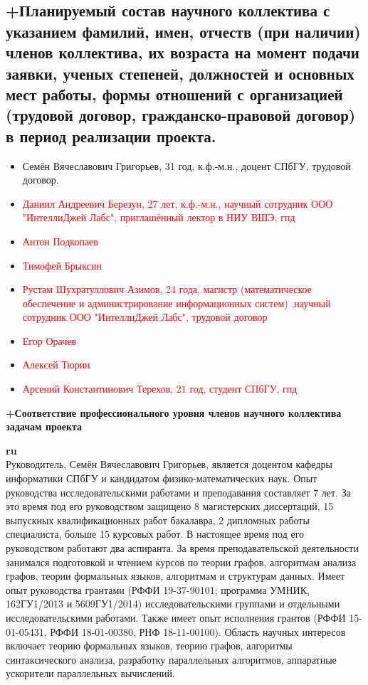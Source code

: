 \documentclass[12pt]{article}  %
\theoremstyle{remark}
\newcommand{\checkme}[1]{\textcolor{red}{#1}}
\begin{document}
\subsection{+Планируемый состав научного коллектива с указанием фамилий, имен, отчеств (при наличии) членов коллектива, их возраста на момент подачи заявки, ученых степеней, должностей и основных мест работы, формы отношений с организацией (трудовой договор, гражданско-правовой договор) в период реализации проекта.}

\begin{itemize}
  \item Семён Вячеславович Григорьев, 31 год, к.ф.-м.н., доцент СПбГУ, трудовой договор.
  \item \checkme{Даниил Андреевич Березун, 27 лет, к.ф.-м.н., научный сотрудник ООО "ИнтеллиДжей Лабс", приглашённый лектор в НИУ ВШЭ, гпд}
  \item \checkme{Антон Подкопаев}
  \item \checkme{Тимофей	Брыксин}
  \item \checkme{Рустам Шухратуллович Азимов, 24 года, магистр (математическое обеспечение и администрирование информационных систем) ,научный сотрудник ООО "ИнтеллиДжей Лабс", трудовой договор}
  \item \checkme{Егор Орачев}
  \item \checkme{Алексей Тюрин}
  \item \checkme{Арсений Константинович Терехов, 21 год, студент СПбГУ, гпд}
\end{itemize}



\textbf{+Соответствие профессионального уровня членов научного коллектива задачам проекта}

\textbf{ru}\\
%
Руководитель, Семён Вячеславович Григорьев, является доцентом кафедры информатики СПбГУ и кандидатом физико-математических наук. Опыт руководства исследовательскими работами и преподавания составляет 7 лет. За это время под его руководством защищено 8 магистерских диссертаций, 15 выпускных квалификационных работ бакалавра, 2 дипломных работы специалиста, больше 15 курсовых работ. В настоящее время под его руководством работают два аспиранта. За время преподавательской деятельности занимался подготовкой и чтением курсов по теории графов, алгоритмам анализа графов, теории формальных языков, алгоритмам и структурам данных. Имеет опыт руководства грантами (РФФИ 19-37-90101; программа УМНИК, 162ГУ1/2013 и 5609ГУ1/2014) исследовательскими группами и отдельными исследовательскими работами. Также имеет опыт исполнения грантов (РФФИ 15-01-05431, РФФИ 18-01-00380, РНФ 18-11-00100). Область научных интересов включает теорию формальных языков, теорию графов, алгоритмы синтаксического анализа, разработку параллельных алгоритмов, аппаратные ускорители параллельных вычислений.
\end{document}
